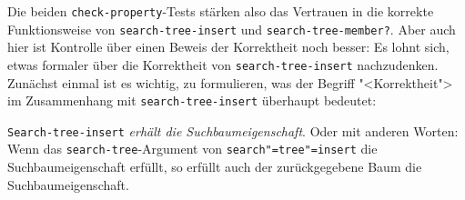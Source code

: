 %
Die beiden \texttt{check-property}-Tests stärken also das Vertrauen in
die korrekte Funktionsweise von \texttt{search-tree-insert} und
\texttt{search-tree-member?}.  Aber auch hier ist Kontrolle über einen
Beweis der Korrektheit noch besser:
Es lohnt sich, etwas formaler über die
Korrektheit von \texttt{search-tree-insert} nachzudenken.  Zunächst
einmal ist es wichtig, zu formulieren, was der Begriff "<Korrektheit">
im Zusammenhang mit \texttt{search-tree-insert} überhaupt bedeutet:
%
\begin{satz}\label{satz:suchbaum}
  \texttt{Search-tree-insert} \emph{erhält die Suchbaumeigenschaft}.
  Oder mit anderen Worten: Wenn das \texttt{search-tree}-Argument von
  \texttt{search"=tree"=insert} die Suchbaumeigenschaft erfüllt, so
  erfüllt auch der zurückgegebene Baum die Suchbaumeigenschaft.
\end{satz}
%
